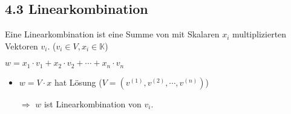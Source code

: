 \subsection{4.3 Linearkombination}{
\vskip1pt
Eine Linearkombination ist eine Summe von mit Skalaren $x_i$ multiplizierten Vektoren $v_i$. ($v_i \in V, x_i \in \mathbb{K}$)
\vskip1pt

\begin{center}
$w = x_1\cdot v_1 + x_2 \cdot v_2 + \dotsm + x_n \cdot v_n$
\end{center}

\begin{itemize}[leftmargin=0.29cm, itemsep=0pt]

\item $w = V \cdot x$ hat Lösung ($V = (v^{(1)}, v^{(2)}, \dotsm, v^{(n)})$) \par 
$\Longrightarrow$ $w$  ist Linearkombination von $v_i$.

\end{itemize}

}
\WhiteSpace
